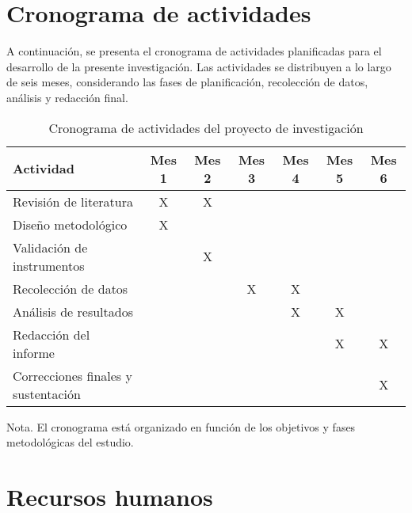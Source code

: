 
\section{Cronograma de actividades}

A continuación, se presenta el cronograma de actividades planificadas para el desarrollo de la presente investigación. Las actividades se distribuyen a lo largo de seis meses, considerando las fases de planificación, recolección de datos, análisis y redacción final.

\begin{table}[H]
\centering
\begin{threeparttable}
\caption{Cronograma de actividades del proyecto de investigación}
\label{tab:cronograma}
\begin{tabular}{@{}p{7cm}cccccc@{}}
\toprule
\textbf{Actividad} & \textbf{Mes 1} & \textbf{Mes 2} & \textbf{Mes 3} & \textbf{Mes 4} & \textbf{Mes 5} & \textbf{Mes 6} \\
\midrule
Revisión de literatura & X & X &   &   &   &   \\
Diseño metodológico & X &   &   &   &   &   \\
Validación de instrumentos &   & X &   &   &   &   \\
Recolección de datos &   &   & X & X &   &   \\
Análisis de resultados &   &   &   & X & X &   \\
Redacción del informe &   &   &   &   & X & X \\
Correcciones finales y sustentación &   &   &   &   &   & X \\
\bottomrule
\end{tabular}
\begin{tablenotes}
\item Nota. El cronograma está organizado en función de los objetivos y fases metodológicas del estudio.
\end{tablenotes}
\end{threeparttable}
\end{table}

\section{Recursos humanos}

